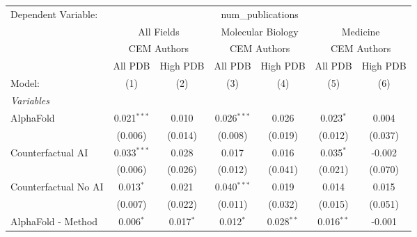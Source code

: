 \begingroup
\centering
\begin{tabular}{lcccccc}
   \tabularnewline \midrule \midrule
   Dependent Variable: & \multicolumn{6}{c}{num\_publications}\\
 & \multicolumn{2}{c}{All Fields} & \multicolumn{2}{c}{Molecular Biology} & \multicolumn{2}{c}{Medicine} \\
\cmidrule(lr){2-3} \cmidrule(lr){4-5} \cmidrule(lr){6-7}
 & \multicolumn{2}{c}{CEM Authors} & \multicolumn{2}{c}{CEM Authors} & \multicolumn{2}{c}{CEM Authors} \\
\cmidrule(lr){2-3} \cmidrule(lr){4-5} \cmidrule(lr){6-7}
 & \multicolumn{1}{c}{All PDB} & \multicolumn{1}{c}{High PDB} & \multicolumn{1}{c}{All PDB} & \multicolumn{1}{c}{High PDB} & \multicolumn{1}{c}{All PDB} & \multicolumn{1}{c}{High PDB} \\
\cmidrule(lr){2-2} \cmidrule(lr){3-3} \cmidrule(lr){4-4} \cmidrule(lr){5-5} \cmidrule(lr){6-6} \cmidrule(lr){7-7}
   Model:                                                     & (1)            & (2)           & (3)           & (4)          & (5)          & (6)\\  
   \midrule
   \emph{Variables}\\
   AlphaFold                                                  & 0.021$^{***}$  & 0.010         & 0.026$^{***}$ & 0.026        & 0.023$^{*}$  & 0.004\\   
                                                              & (0.006)        & (0.014)       & (0.008)       & (0.019)      & (0.012)      & (0.037)\\   
   Counterfactual AI                                          & 0.033$^{***}$  & 0.028         & 0.017         & 0.016        & 0.035$^{*}$  & -0.002\\   
                                                              & (0.006)        & (0.026)       & (0.012)       & (0.041)      & (0.021)      & (0.070)\\   
   Counterfactual No AI                                       & 0.013$^{*}$    & 0.021         & 0.040$^{***}$ & 0.019        & 0.014        & 0.015\\   
                                                              & (0.007)        & (0.022)       & (0.011)       & (0.032)      & (0.015)      & (0.051)\\   
   AlphaFold - Method                                         & 0.006$^{*}$    & 0.017$^{*}$   & 0.012$^{*}$   & 0.028$^{**}$ & 0.016$^{**}$ & -0.001\\   

\end{tabular}
